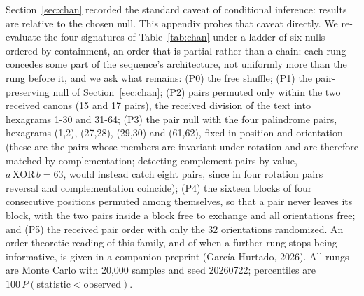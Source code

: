 \documentclass[11pt]{article}
\begin{document}
Section~\ref{sec:chan} recorded the standard caveat of conditional inference: results are relative to the chosen null. This appendix probes that caveat directly. We re-evaluate the four signatures of Table~\ref{tab:chan} under a ladder of six nulls ordered by containment, an order that is partial rather than a chain: each rung concedes some part of the sequence's architecture, not uniformly more than the rung before it, and we ask what remains: (P0) the free shuffle; (P1) the pair-preserving null of Section~\ref{sec:chan}; (P2) pairs permuted only within the two received canons (15 and 17 pairs), the received division of the text into hexagrams 1-30 and 31-64; (P3) the pair null with the four palindrome pairs, hexagrams (1,2), (27,28), (29,30) and (61,62), fixed in position and orientation (these are the pairs whose members are invariant under rotation and are therefore matched by complementation; detecting complement pairs by value, \(a\,\mathrm{XOR}\,b = 63\), would instead catch eight pairs, since in four rotation pairs reversal and complementation coincide); (P4) the sixteen blocks of four consecutive positions permuted among themselves, so that a pair never leaves its block, with the two pairs inside a block free to exchange and all orientations free; and (P5) the received pair order with only the 32 orientations randomized. An order-theoretic reading of this family, and of when a further rung stops being informative, is given in a companion preprint (García Hurtado, 2026). All rungs are Monte Carlo with 20,000 samples and seed 20260722; percentiles are $100\,P(\text{statistic} < \text{observed})$.
\end{document}
